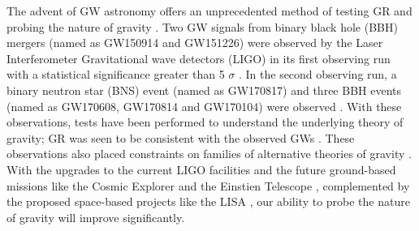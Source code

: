 The advent of GW astronomy offers an unprecedented method of testing GR and probing the nature of gravity \cite{kipGWGR}. Two GW signals from binary black hole (BBH) mergers (named as GW150914 and GW151226) were observed by the Laser Interferometer Gravitational wave detectors (LIGO) in its first observing run with a statistical significance greater than 5 $\sigma$ \cite{TheLIGOScientific:2016pea}. In the second observing run, a binary neutron star (BNS) event (named as GW170817) and three BBH events (named as GW170608, GW170814 and GW170104) were observed \cite{GW170608, GW170814,GW170104, GW170817}. With these observations, tests have been performed to understand the underlying theory of gravity; GR was seen to be consistent with the observed GWs \cite{TheLIGOScientific:2016src}. These observations also placed constraints on families of alternative theories of gravity  \cite{Yunes:2016jcc,TheLIGOScientific:2016src,2016arXiv160308955Y}. With the upgrades to the current LIGO facilities \cite{2015PhRvD..91f2005M} and the future ground-based missions like the Cosmic Explorer \cite{Evans:2016dc} and the Einstien Telescope \cite{0264-9381-28-9-094013}, complemented by the proposed space-based projects like the LISA \cite{LISA}, our ability to probe the nature of gravity will improve significantly. 


